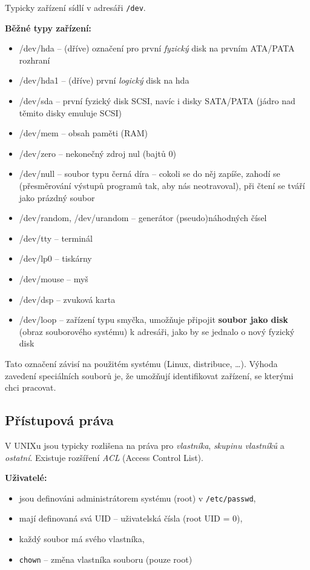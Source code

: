 \documentclass[a4paper, 11pt]{article}
\newcommand{\tcmd}[1]{\texttt{#1}}
\begin{document}
Typicky zařízení sídlí v adresáři \tcmd{/dev}.
 
\textbf{Běžné typy zařízení:}
\begin{itemize}
    \item /dev/hda -- (dříve) označení pro první \emph{fyzický} disk na prvním ATA/PATA rozhraní
    \item /dev/hda1 -- (dříve) první \emph{logický} disk na hda
    \item /dev/sda -- první fyzický disk SCSI, navíc i disky SATA/PATA (jádro nad těmito disky emuluje SCSI)
    \item /dev/mem -- obsah paměti (RAM)
    \item /dev/zero -- nekonečný zdroj nul (bajtů 0)
    \item /dev/null -- soubor typu černá díra -- cokoli se do něj zapíše, zahodí se (přesměrování výstupů programů tak, aby nás neotravoval), při čtení se tváří jako prázdný soubor
    \item /dev/random, /dev/urandom -- generátor (pseudo)náhodných čísel
    \item /dev/tty -- terminál
    \item /dev/lp0 -- tiskárny
    \item /dev/mouse -- myš
    \item /dev/dsp -- zvuková karta
    \item /dev/loop -- zařízení typu smyčka, umožňuje připojit \textbf{soubor jako disk} (obraz souborového systému) k adresáři, jako by se jednalo o nový fyzický disk
\end{itemize}
 
Tato označení závisí na použitém systému (Linux, distribuce, \ldots). Výhoda zavedení speciálních souborů je, že umožňují identifikovat zařízení, se kterými chci pracovat.

\newpage

\subsection{Přístupová práva}
V UNIXu jsou typicky rozlišena na práva pro \emph{vlastníka}, \emph{skupinu vlastníků} a \emph{ostatní}. Existuje rozšíření \emph{ACL} (Access Control List).
 
\textbf{Uživatelé:}
\begin{itemize}
    \item jsou definováni administrátorem systému (root) v \tcmd{/etc/passwd},
    \item mají definovaná svá UID -- uživatelská čísla (root UID = 0),
    \item každý soubor má svého vlastníka,
    \item \tcmd{chown} -- změna vlastníka souboru (pouze root)
\end{itemize}
 
\end{document}
